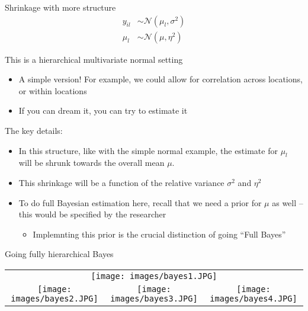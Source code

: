 \documentclass[notes,11pt, aspectratio=169]{beamer}
\newenvironment{wideitemize}{\itemize\addtolength{\itemsep}{10pt}}{\enditemize}
\begin{document}
\begin{frame}{Shrinkage with more structure}
    \begin{align*}
      y_{il} &\sim \mathcal{N}(\mu_{l}, \sigma^{2})\\
      \mu_{l} &\sim \mathcal{N}(\mu, \eta^{2})
    \end{align*}
  \begin{wideitemize}
  \item This is a hierarchical multivariate normal setting
    \begin{itemize}
    \item A simple version! For example, we could allow for
      correlation across locations, or within locations
    \item If you can dream it, you can try to estimate it
    \end{itemize}
  \item The key details:
    \begin{itemize}
    \item In this structure, like with the simple normal example, the
      estimate for $\mu_{l}$ will be shrunk towards the overall mean
      $\mu$. 
    \item This shrinkage will be a function of the relative variance $\sigma^{2}$ and $\eta^{2}$
    \item To do full Bayesian estimation here, recall that we need a
      prior for $\mu$ as well -- this would be specified by the
      researcher
      \begin{itemize}
      \item Implemnting this prior is the crucial distinction of going
        ``Full Bayes''
      \end{itemize}
    \end{itemize}
  \end{wideitemize}
\end{frame}

\begin{frame}{Going fully hierarchical Bayes}
\begin{center}
\begin{tabular}{ccc}
  \multicolumn{3}{c}{\texttt{[image: images/bayes1.JPG]}}\\
  \texttt{[image: images/bayes2.JPG]} & \texttt{[image: images/bayes3.JPG]} & \texttt{[image: images/bayes4.JPG]}\\
\end{tabular}
\end{center}
\end{frame}
\end{document}
